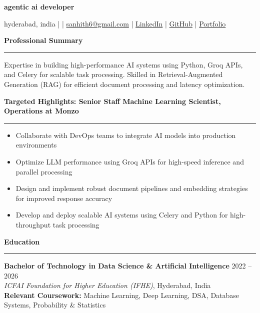 \documentclass[9pt, letterpaper]{article}
\newcommand{\name}[1]{%
    \begin{center}
        {\LARGE \textbf{#1}}
    \end{center}
}
\newcommand{\sectionheading}[1]{%
    \vspace{4pt}%
    {\large \textbf{#1}}%
    \vspace{1pt}%
    \hrule
    \vspace{2pt}%
}
\begin{document}
\name{agentic ai developer}
\begin{center}
    hyderabad, india \quad |  \quad | \quad
    \href{mailto:sanhith6@gmail.com}{sanhith6@gmail.com} \quad | \quad
    \href{https://www.linkedin.com/in/sanhith-reddy-740a1625b/}{LinkedIn} \quad | \quad
    \href{https://github.com/tsanhith}{GitHub} \quad | \quad
    \href{https://johndoe.dev}{Portfolio}
\end{center}

\vspace{0pt}

\sectionheading{Professional Summary}
Expertise in building high-performance AI systems using Python, Groq APIs, and Celery for scalable task processing. Skilled in Retrieval-Augmented Generation (RAG) for efficient document processing and latency optimization.

\sectionheading{Targeted Highlights: Senior Staff Machine Learning Scientist, Operations at Monzo}
\begin{itemize}[leftmargin=0.25in, itemindent=-0.15in, label={--}]
    \item Collaborate with DevOps teams to integrate AI models into production environments
    \item Optimize LLM performance using Groq APIs for high-speed inference and parallel processing
    \item Design and implement robust document pipelines and embedding strategies for improved response accuracy
    \item Develop and deploy scalable AI systems using Celery and Python for high-throughput task processing
\end{itemize}

\sectionheading{Education}
\textbf{Bachelor of Technology in Data Science \& Artificial Intelligence} \hfill 2022 -- 2026 \\
\textit{ICFAI Foundation for Higher Education (IFHE)}, Hyderabad, India \\
\textbf{Relevant Coursework:} Machine Learning, Deep Learning, DSA, Database Systems, Probability \& Statistics
\end{document}
